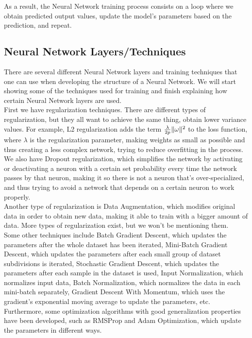As a result, the Neural Network training process consists on a loop where we obtain predicted output values, update the model's parameters based on the prediction, and repeat.\\

\subsection{Neural Network Layers/Techniques}
There are several different Neural Network layers and training techniques that one can use when developing the structure of a Neural Network. We will start showing some of the techniques used for training and finish explaining how certain Neural Network layers are used.\\

First we have regularization techniques. There are different types of regularization, but they all want to achieve the same thing, obtain lower variance values. For example, L2 regularization adds the term $\frac{\lambda}{2p}\lVert\omega\rVert^2$ to the loss function, where $\lambda$ is the regularization parameter, making weights as small as possible and thus creating a less complex network, trying to reduce overfitting in the process.\\ 

We also have Dropout regularization, which simplifies the network by activating or deactivating a neuron with a certain set probability every time the network passes by that neuron, making it so there is not a neuron that's over-specialized, and thus trying to avoid a network that depends on a certain neuron to work properly.\\

Another type of regularization is Data Augmentation, which modifies original data in order to obtain new data, making it able to train with a bigger amount of data. More types of regularization exist, but we won't be mentioning them.\\

Some other techniques include Batch Gradient Descent, which updates the parameters after the whole dataset has been iterated, Mini-Batch Gradient Descent, which updates the parameters after each small group of dataset subdivisions is iterated, Stochastic Gradient Descent, which updates the parameters after each sample in the dataset is used, Input Normalization, which normalizes input data, Batch Normalization, which normalizes the data in each mini-batch separately, Gradient Descent With Momentum, which uses the gradient's exponential moving average to update the parameters, etc. Furthermore, some optimization algorithms with good generalization properties have been developed, such as RMSProp and Adam Optimization, which update the parameters in different ways.\\

